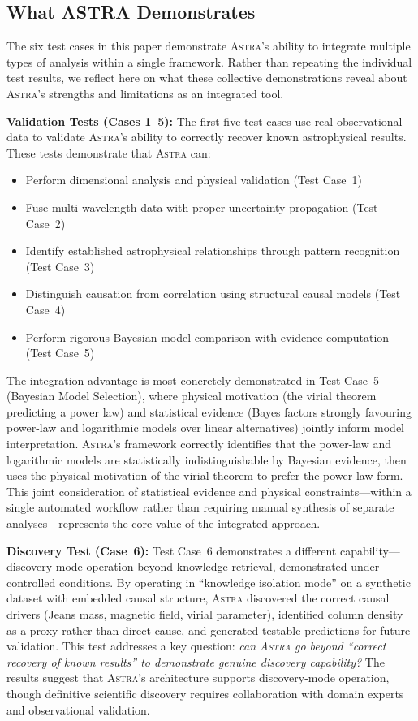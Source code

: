 \documentclass[fleqn,usenatbib]{mnras}
\newcommand{\astra}{\textsc{Astra}\xspace}
\begin{document}
\subsection{What ASTRA Demonstrates}
\label{sec:discussion:demonstrates}

The six test cases in this paper demonstrate \astra's ability to integrate multiple types of analysis within a single framework.
Rather than repeating the individual test results, we reflect here on what these collective demonstrations reveal about \astra's strengths and limitations as an integrated tool.

\textbf{Validation Tests (Cases 1--5):}
The first five test cases use real observational data to validate \astra's ability to correctly recover known astrophysical results.
These tests demonstrate that \astra can:
\begin{itemize}
  \item Perform dimensional analysis and physical validation (Test Case~1)
  \item Fuse multi-wavelength data with proper uncertainty propagation (Test Case~2)
  \item Identify established astrophysical relationships through pattern recognition (Test Case~3)
  \item Distinguish causation from correlation using structural causal models (Test Case~4)
  \item Perform rigorous Bayesian model comparison with evidence computation (Test Case~5)
\end{itemize}

The integration advantage is most concretely demonstrated in Test Case~5 (Bayesian Model Selection), where physical motivation (the virial theorem predicting a power law) and statistical evidence (Bayes factors strongly favouring power-law and logarithmic models over linear alternatives) jointly inform model interpretation.
\astra's framework correctly identifies that the power-law and logarithmic models are statistically indistinguishable by Bayesian evidence, then uses the physical motivation of the virial theorem to prefer the power-law form.
This joint consideration of statistical evidence and physical constraints---within a single automated workflow rather than requiring manual synthesis of separate analyses---represents the core value of the integrated approach.

\textbf{Discovery Test (Case~6):}
Test Case~6 demonstrates a different capability---discovery-mode operation beyond knowledge retrieval, demonstrated under controlled conditions.
By operating in ``knowledge isolation mode'' on a synthetic dataset with embedded causal structure, \astra discovered the correct causal drivers (Jeans mass, magnetic field, virial parameter), identified column density as a proxy rather than direct cause, and generated testable predictions for future validation.
This test addresses a key question: \emph{can \astra go beyond ``correct recovery of known results'' to demonstrate genuine discovery capability?}
The results suggest that \astra's architecture supports discovery-mode operation, though definitive scientific discovery requires collaboration with domain experts and observational validation.
\end{document}
